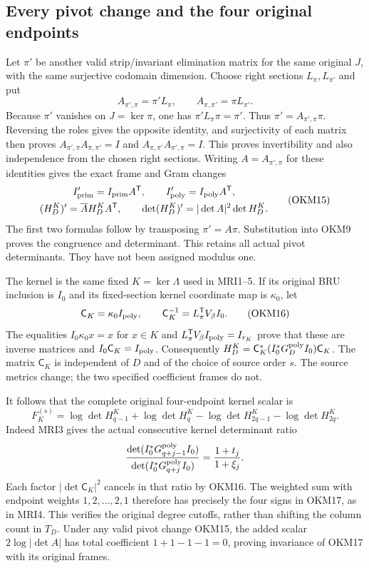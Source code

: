 \documentclass[11pt,a4paper]{article}
\begin{document}
\subsection{Every pivot change and the four original endpoints}
Let $\pi'$ be another valid strip/invariant elimination matrix for
the same original $J$, with the same surjective codomain dimension.
Choose right sections $L_\pi,L_{\pi'}$ and put
\[
 A_{\pi',\pi}=\pi'L_\pi,
 \qquad A_{\pi,\pi'}=\pi L_{\pi'}.
 \tag{OKM14}
\]
Because $\pi'$ vanishes on $J=\ker\pi$, one has
$\pi' L_\pi\pi=\pi'$. Thus
$\pi'=A_{\pi',\pi}\pi$. Reversing the roles gives the
opposite identity, and surjectivity of each matrix then proves
$A_{\pi',\pi}A_{\pi,\pi'}=I$ and
$A_{\pi,\pi'}A_{\pi',\pi}=I$. This proves invertibility and
also independence from the chosen right sections. Writing
$A=A_{\pi',\pi}$ for these identities gives the exact frame
and Gram changes
\[
 \begin{gathered}
 I'_{\rm prim}=I_{\rm prim}A^{\mathsf T},\qquad
 I'_{\rm poly}=I_{\rm poly}A^{\mathsf T},\\
 (H_D^K)'=\overline A H_D^K A^{\mathsf T},\qquad
 \det(H_D^K)'=|\det A|^2\det H_D^K.
 \end{gathered}\tag{OKM15}
\]
The first two formulas follow by transposing $\pi'=A\pi$.
Substitution into OKM9 proves the congruence and determinant.
This retains all actual pivot determinants. They have not been
assigned modulus one.

The kernel is the same fixed $K=\ker\Lambda$ used in MRI1--5.
If its original BRU inclusion is $I_0$ and its fixed-section kernel
coordinate map is $\kappa_0$, let
\[
 \mathsf C_K=\kappa_0I_{\rm poly},\qquad
 \mathsf C_K^{-1}=L_\pi^{\mathsf T}V_\beta I_0.
 \tag{OKM16}
\]
The equalities $I_0\kappa_0x=x$ for $x\in K$ and
$L_\pi^{\mathsf T}V_\beta I_{\rm poly}=I_{r_K}$ prove that
these are inverse matrices and $I_0\mathsf C_K=I_{\rm poly}$.
Consequently
$H_D^K=\mathsf C_K^*(I_0^*G_D^{\rm poly}I_0)\mathsf C_K$.
The matrix $\mathsf C_K$ is independent of $D$ and of the choice of source
order $s$. The source metrics change; the two specified coefficient
frames do not.

It follows that the complete original four-endpoint kernel scalar is
\[
 \boxed{\displaystyle
 F_K^{(s)}=
 \log\det H_{q-1}^K+\log\det H_q^K
       -\log\det H_{2q-1}^K-\log\det H_{2q}^K.}
 \tag{OKM17}
\]
Indeed MRI3 gives the actual consecutive kernel determinant ratio
\[
 \frac{\det(I_0^*G_{q+j-1}^{\rm poly}I_0)}
      {\det(I_0^*G_{q+j}^{\rm poly}I_0)}
 =\frac{1+t_j}{1+\xi_j}.
\]
Each factor $|\det\mathsf C_K|^2$ cancels in that ratio by OKM16.
The weighted sum with endpoint weights $1,2,\ldots,2,1$ therefore
has precisely the four signs in OKM17, as in MRI4. This verifies
the original degree cutoffs, rather than shifting the column count
in $T_D$. Under any valid pivot change OKM15, the added scalar
$2\log|\det A|$ has total coefficient $1+1-1-1=0$, proving
invariance of OKM17 with its original frames.
\end{document}
